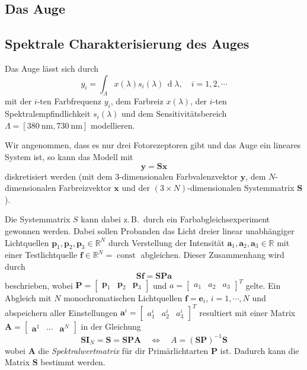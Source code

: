 \documentclass[a4paper, 11pt, accentcolor = tud3b]{tudreport}
\DeclareMathOperator{\total}{d}
\DeclareMathOperator{\const}{const}
\newcommand{\dif}[1]{\,\total#1}
\newcommand{\R}{\mathbb{R}}
\newcommand{\mat}[1]{\boldsymbol{#1}}
\renewcommand{\vec}[1]{\boldsymbol{\mathbf{#1}}}
\newcommand{\zB}{z.\,B.~}
\begin{document}
			\subsection{Das Auge} %

			\subsection{Spektrale Charakterisierung des Auges}
				Das Auge lässt sich durch
				\begin{equation*}
					y_i = \int_{\Lambda} \! x(\lambda) s_i(\lambda) \dif{\lambda},\quad i = 1, 2, \cdots
				\end{equation*}
				mit der \(i\)-ten Farbfrequenz \(y_i\), dem Farbreiz \(x(\lambda)\), der \(i\)-ten Spektralempfindlichkeit \(s_i(\lambda)\) und dem Sensitivitätsbereich \( \Lambda = [\SI{380}{\nano\meter}, \SI{730}{\nano\meter}] \) modellieren.
				
				Wir angenommen, dass es nur drei Fotorezeptoren gibt und das Auge ein lineares System ist, so kann das Modell mit
				\begin{equation*}
					\vec{y} = \mat{S} \vec{x}
				\end{equation*}
				diskretisiert werden (mit dem 3-dimensionalen Farbvalenzvektor \(\vec{y}\), dem \(N\)-dimensionalen Farbreizvektor \(\vec{x}\) und der \( (3 \times N) \)-dimensionalen Systemmatrix \( \mat{S} \)).
				
				Die Systemmatrix \(S\) kann dabei \zB durch ein Farbabgleichsexperiment gewonnen werden. Dabei sollen Probanden das Licht dreier linear unabhängiger Lichtquellen \( \vec{p}_1, \vec{p}_2, \vec{p}_3 \in \R^N \) durch Verstellung der Intensität \( \vec{a}_1, \vec{a}_2, \vec{a}_3 \in \R \) mit einer Testlichtquelle \( \vec{f} \in \R^N = \const \) abgleichen. Dieser Zusammenhang wird durch
				\begin{equation*}
					\mat{S} \vec{f} = \mat{S} \mat{P} \vec{a}
				\end{equation*}
				beschrieben, wobei \( \mat{P} = \begin{bmatrix} \vec{p}_1 & \vec{p}_2 & \vec{p}_3 \end{bmatrix} \) und \( a = \begin{bmatrix} a_1 & a_2 & a_3 \end{bmatrix}^T \) gelte. Ein Abgleich mit \(N\) monochromatischen Lichtquellen \( \vec{f} = \vec{e}_i \), \( i = 1, \cdots, N \) und abspeichern aller Einstellungen \( \vec{a}^i = \begin{bmatrix} a_1^i & a_2^i & a_3^i \end{bmatrix}^T \) resultiert mit einer Matrix \( \mat{A} = \begin{bmatrix} \vec{a}^1 & \cdots & \vec{a}^N \end{bmatrix} \) in der Gleichung
				\begin{equation*}
					\mat{S} \mat{I}_N = \mat{S} = \mat{S} \mat{P} \mat{A} \quad\iff\quad A = ( \mat{S} \mat{P} )^{-1} \mat{S}
				\end{equation*}
				wobei \( \mat{A} \) die \emph{Spektralwertmatrix} für dir Primärlichtarten \( \mat{P} \) ist. Dadurch kann die Matrix \( \mat{S} \) bestimmt werden.
\end{document}
